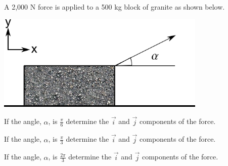 


\begin{problem}
\item A 2,000 N force is applied to a 500 kg block of granite as shown
  below.

  \includegraphics[width=10cm]{ink/week7/dragBlock}

  \begin{subproblem}
  \item If the angle, $\alpha$, is $\frac{\pi}{6}$ determine the
    $\vec{i}$ and $\vec{j}$ components of the force.
    \vfill
  \item If the angle, $\alpha$, is $\frac{\pi}{3}$ determine the
    $\vec{i}$ and $\vec{j}$ components of the force.
    \vfill
  \item If the angle, $\alpha$, is $\frac{2\pi}{3}$ determine the
    $\vec{i}$ and $\vec{j}$ components of the force.
    \vfill
  \end{subproblem}
\end{problem}


